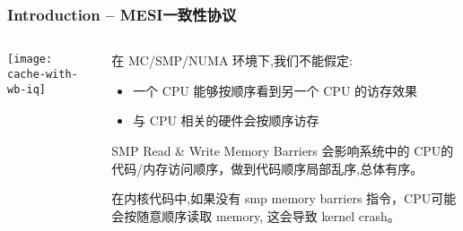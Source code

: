 \begin{frame}[plain]	
    \frametitle{Introduction -- MESI一致性协议}
    
    
    \begin{columns}
        
        \begin{column}{.4\textwidth}
            \texttt{[image: cache-with-wb-iq]}
        \end{column}
        \begin{column}{.6\textwidth}
            在 MC/SMP/NUMA 环境下,我们不能假定:
            

            \begin{itemize}
                \item 一个 CPU 能够按顺序看到另一个 CPU 的访存效果
                \item 与 CPU 相关的硬件会按顺序访存
   
            \end{itemize}
            SMP Read \& Write Memory Barriers 会影响系统中的
            CPU的代码/内存访问顺序，做到代码顺序局部乱序,总体有序。
            
            在内核代码中,如果没有 smp memory barriers 指令，CPU可能会按随意顺序读取 memory,
            这会导致 kernel crash。
            
        \end{column}
    \end{columns}
    \end{frame}
